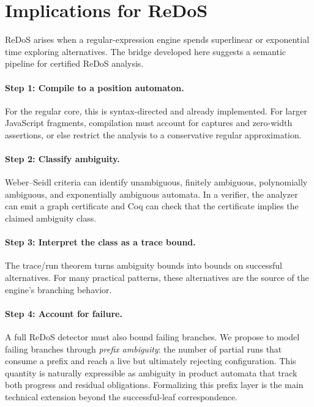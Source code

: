 \section{Implications for ReDoS}
\label{sec:redos}

ReDoS arises when a regular-expression engine spends superlinear or exponential
time exploring alternatives.  The bridge developed here suggests a semantic
pipeline for certified ReDoS analysis.

\paragraph{Step 1: Compile to a position automaton.}
For the regular core, this is syntax-directed and already implemented.  For
larger JavaScript fragments, compilation must account for captures and
zero-width assertions, or else restrict the analysis to a conservative regular
approximation.

\paragraph{Step 2: Classify ambiguity.}
Weber--Seidl criteria can identify unambiguous, finitely ambiguous,
polynomially ambiguous, and exponentially ambiguous automata.  In a verifier,
the analyzer can emit a graph certificate and Coq can check that the certificate
implies the claimed ambiguity class.

\paragraph{Step 3: Interpret the class as a trace bound.}
The trace/run theorem turns ambiguity bounds into bounds on successful
alternatives.  For many practical patterns, these alternatives are the source of
the engine's branching behavior.

\paragraph{Step 4: Account for failure.}
A full ReDoS detector must also bound failing branches.  We propose to model
failing branches through \emph{prefix ambiguity}: the number of partial runs that
consume a prefix and reach a live but ultimately rejecting configuration.  This
quantity is naturally expressible as ambiguity in product automata that track
both progress and residual obligations.  Formalizing this prefix layer is the
main technical extension beyond the successful-leaf correspondence.
